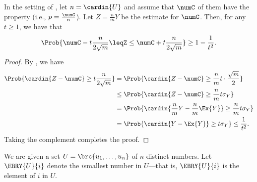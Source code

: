 \begin{lemma}
    In the setting of , let $n= \cardin{U}$ and
    assume that $\numC$ of them have the property (i.e.,
    $p=\tfrac{\numC}{n}$). Let $Z = \tfrac{n}{m}Y$ be the estimate for
    $\numC$.  Then, for any $t\geq 1$, we have that
    \begin{equation*}
        \Prob{ \Bigl. \smash{\numC - t \frac{n}{2\sqrt{m}}%
              \leq%
              Z%
              \leq%
              \numC + t \frac{n}{2\sqrt{m}} } }%
        \geq%
        1- \frac{1}{t^2}.
    \end{equation*}
\end{lemma}
\begin{proof}
    By , we have
    \begin{align*}
        \Prob{\bigl. \cardin{Z - \numC } \geq t \frac{n}{2\sqrt{m}} }%
        &=
        \Prob{\bigl. \cardin{Z - \numC } \geq
           \frac{n}{m}t \cdot \frac{\sqrt{m}}{2} }%
        \\&
        \leq
        \Prob{\bigl. \cardin{Z - \numC } \geq
           \frac{n}{m}t \sigma_Y }%
        \\&
        =
        \Prob{\bigl. \cardin{\frac{n}{m}Y - \frac{n}{m} \Ex{Y} } \geq
           \frac{n}{m}t \sigma_Y }%
        \\&%
        =%
        \Prob{\bigl. \cardin{Y - \Ex{Y} } \geq t \sigma_Y }%
        \leq
        \frac{1}{t^2}.
    \end{align*}
    Taking the complement completes the proof.
\end{proof}






We are given a set $U = \brc{u_1,\ldots, u_n}$ of $n$ distinct numbers. Let
$\EBRY{U}{i}$ denote the $i$\th smallest number in $U$---that is,
$\EBRY{U}{i}$ is the element of  $i$ in $U$.

